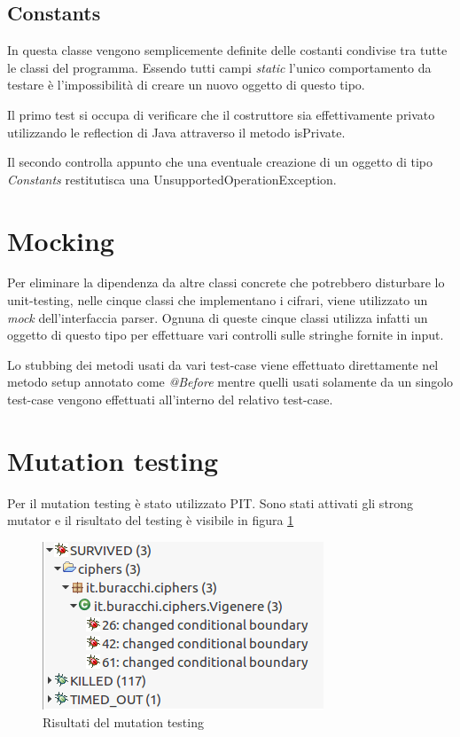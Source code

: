 		\subsection{Constants}
			In questa classe vengono semplicemente definite delle costanti condivise tra tutte le classi del programma. Essendo tutti campi \emph{static} l'unico comportamento da testare è l'impossibilità di creare un nuovo oggetto di questo tipo.
			
			Il primo test si occupa di verificare che il costruttore sia effettivamente privato utilizzando le reflection di Java attraverso il metodo isPrivate.
			
			Il secondo controlla appunto che una eventuale creazione di un oggetto di tipo \emph{Constants} restitutisca una UnsupportedOperationException.
			
	\section{Mocking}
		Per eliminare la dipendenza da altre classi concrete che potrebbero disturbare lo unit-testing, nelle cinque classi che implementano i cifrari, viene utilizzato un \emph{mock} dell'interfaccia parser.	Ognuna di queste cinque classi utilizza infatti un oggetto di questo tipo per effettuare vari controlli sulle stringhe fornite in input.
		
		Lo stubbing dei metodi usati da vari test-case viene effettuato direttamente nel metodo setup annotato come \emph{@Before} mentre quelli usati solamente da un singolo test-case vengono effettuati all'interno del relativo test-case.
		
	\section{Mutation testing}
		Per il mutation testing è stato utilizzato PIT. Sono stati attivati gli strong mutator e il risultato del testing è visibile in figura \ref{fig:pit}
		
		\begin{figure}[h]
			\centering
			\includegraphics[scale=0.5]{img/PIT}
			\caption{Risultati del mutation testing}
			\label{fig:pit}
		\end{figure}
		
